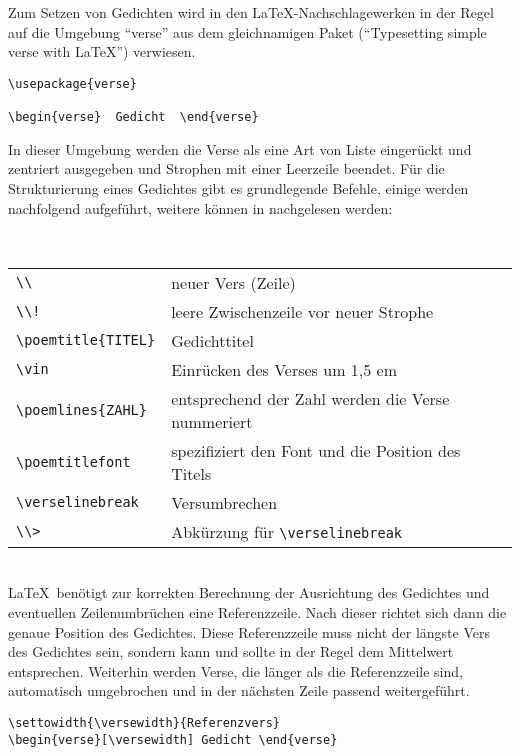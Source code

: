 Zum Setzen von Gedichten wird in den \LaTeX -Nachschlagewerken in der Regel
auf die Umgebung "`verse"' aus dem gleichnamigen  Paket ("`Typesetting simple 
verse with \LaTeX "') verwiesen. 

\begin{lstlisting}
\usepackage{verse}

\begin{verse}  Gedicht  \end{verse}
\end{lstlisting}

In dieser Umgebung werden die Verse als eine Art von Liste eingerückt und zentriert
ausgegeben und Strophen mit einer Leerzeile beendet. Für die
Strukturierung eines Gedichtes gibt es grundlegende Befehle, einige werden
nachfolgend aufgeführt, weitere können in \cite[5\psq]{wilson:lyrik} nachgelesen
werden:

~\\
\begin{tabular}{ll}
\verb|\\| & neuer Vers (Zeile) \\
\verb|\\!|& leere Zwischenzeile vor neuer Strophe \\
\verb|\poemtitle{TITEL}| & Gedichttitel \\
\verb|\vin| & Einrücken des Verses um 1,5 em \\
\verb|\poemlines{ZAHL}| & entsprechend der Zahl werden die Verse nummeriert\\
\verb|\poemtitlefont| & spezifiziert den Font und die Position des Titels\\
\verb|\verselinebreak| & Versumbrechen \\
\verb|\\>| & Abkürzung für \verb|\verselinebreak|\\
\end{tabular}

~\\
\LaTeX\ benötigt zur korrekten Berechnung der Ausrichtung des Gedichtes und
eventuellen Zeilenumbrüchen eine Referenzzeile. Nach dieser richtet sich dann die 
genaue Position des Gedichtes. Diese Referenzzeile muss nicht der längste Vers des 
Gedichtes sein, sondern kann und sollte in der Regel dem Mittelwert entsprechen.
Weiterhin werden Verse, die länger als die Referenzzeile sind,
automatisch umgebrochen und in der nächsten Zeile 
passend weitergeführt. \cite{wilson:memoir} 
\begin{lstlisting}
\settowidth{\versewidth}{Referenzvers}
\begin{verse}[\versewidth] Gedicht \end{verse}
\end{lstlisting}

